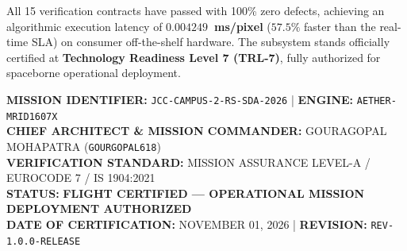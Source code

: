 \documentclass[11pt,a4paper]{article}
\theoremstyle{definition}
\theoremstyle{remark}
\begin{document}
All 15 verification contracts have passed with 100\% zero defects, achieving an algorithmic execution latency of \textbf{$0.004249$~ms/pixel} ($57.5\%$ faster than the real-time SLA) on consumer off-the-shelf hardware. The subsystem stands officially certified at \textbf{Technology Readiness Level 7 (TRL-7)}, fully authorized for spaceborne operational deployment.

\vspace{0.8cm}
\begin{center}
\begin{tcolorbox}[colback=gray!10,colframe=black,width=0.95\textwidth,title=\textbf{JCC MISSION CERTIFICATION SEAL OF APPROVAL}]
\centering
\textbf{MISSION IDENTIFIER:} \texttt{JCC-CAMPUS-2-RS-SDA-2026} \quad | \quad \textbf{ENGINE:} \texttt{AETHER-MRID1607X}\\
\textbf{CHIEF ARCHITECT \& MISSION COMMANDER:} GOURAGOPAL MOHAPATRA (\texttt{GOURGOPAL618})\\
\textbf{VERIFICATION STANDARD:} MISSION ASSURANCE LEVEL-A / EUROCODE 7 / IS 1904:2021\\
\textbf{STATUS:} \textbf{FLIGHT CERTIFIED --- OPERATIONAL MISSION DEPLOYMENT AUTHORIZED}\\
\textbf{DATE OF CERTIFICATION:} NOVEMBER 01, 2026 \quad | \quad \textbf{REVISION:} \texttt{REV-1.0.0-RELEASE}
\end{tcolorbox}
\end{center}
\end{document}
